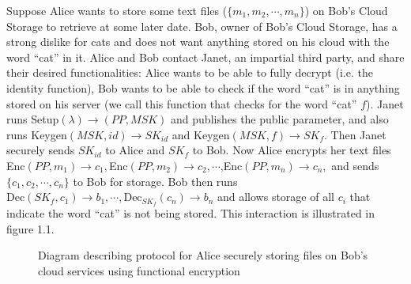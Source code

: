 \documentclass[12pt,twoside]{reedthesis}
\newcommand{\dec}[0]{\text{Dec}}
\begin{document}
\par Suppose Alice wants to store some text files ($\{m_1,m_2,\cdots, m_n \}$) on Bob's Cloud Storage to retrieve at some later date.
 Bob, owner of Bob's Cloud Storage, has a strong dislike for cats and does not want anything stored on
  his cloud with the word ``cat'' in it. Alice and Bob contact Janet, an impartial third party, and share their desired functionalities: Alice wants to be able to fully decrypt (i.e. the identity function), Bob wants to be able to check if the word ``cat'' is in anything stored on his server (we call this function that checks for the word ``cat'' $f$). Janet runs Setup$(\lambda)\rightarrow (PP, MSK)$ and publishes the public parameter, and also runs Keygen$(MSK,id) \rightarrow SK_{id}$ and Keygen$(MSK,f) \rightarrow SK_f$. Then Janet securely sends $SK_{id}$ to Alice and $SK_{f}$ to Bob. Now Alice encrypts her text files Enc$(PP, m_1) \rightarrow c_1,$Enc$(PP,m_2) \rightarrow c_2, \cdots $,Enc$(PP, m_n) \rightarrow c_n,$ and sends $\{c_1,c_2, \cdots, c_n \}$ to Bob for storage. Bob then runs $\dec(SK_f , c_1) \rightarrow b_1 , \cdots, \dec_{SK_f}(c_n) \rightarrow b_n $ and allows storage of all $c_i$ that indicate the word ``cat'' is not being stored.  This interaction is illustrated in figure 1.1.
  
  \begin{figure}[htbp]
	   
	       \centering


	     \caption{Diagram describing protocol for Alice securely storing files on Bob's cloud services using functional encryption}
	 \label{subd}
	\end{figure}
\end{document}
